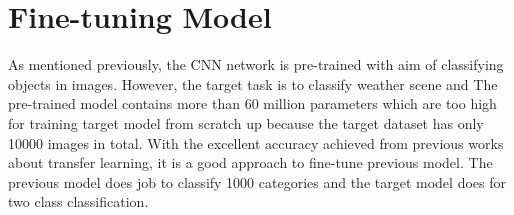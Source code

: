 \section{Fine-tuning Model}

As mentioned previously, the CNN network is pre-trained with aim of classifying objects in images. However, the target task is to classify weather scene and  The pre-trained model contains more than 60 million parameters which are too high for training target model from scratch up because the target dataset has only 10000 images in total. With the excellent accuracy achieved from previous works about transfer learning, it is a good approach to fine-tune previous model. The previous model does job to classify 1000 categories and the target model does for two class classification.  